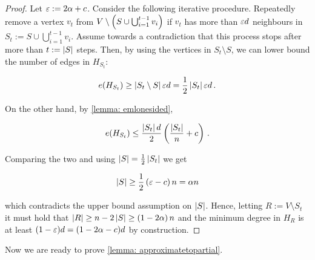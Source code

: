 

\begin{proof}
    Let $\varepsilon:=2\alpha + c$. Consider the following iterative procedure. Repeatedly remove a vertex $v_t$ from $V\setminus \left(S \cup \bigcup_{i=1}^{t-1} v_i\right)$ if $v_t$ has more than $\varepsilon d$ neighbours in $S_t := S \cup \bigcup_{i=1}^{t-1} v_i$. Assume towards a contradiction that this process stops after more than $t:=\left\lvert S\right\rvert$ steps. Then, by using the vertices in $S_t\setminus S$, we can lower bound the number of edges in $H_{S_t}$:

    $$e(H_{S_t})\geq \left\lvert S_t\setminus S\right\rvert \varepsilon d= \frac{1}{2}\left\lvert S_t\right\rvert\varepsilon d\,.$$

    On the other hand, by \cref{lemma: emlonesided},

    $$e(H_{S_t})\leq \frac{\left\lvert S_t\right\rvert d}{2}\left(\frac{\left\lvert S_t\right\rvert}{n} + c\right)\,.$$

    Comparing the two and using $\left\lvert S\right\rvert=\frac{1}{2}\left\lvert S_t\right\rvert$ we get

    $$\left\lvert S\right\rvert\geq\frac{1}{2}\left(\varepsilon-c\right)n=\alpha n$$

    which contradicts the upper bound assumption on $\left\lvert S\right\rvert$. Hence, letting $R:=V\setminus S_t$ it must hold that $\left\lvert R\right\rvert\geq n-2\left\lvert S\right\rvert\geq \left(1-2\alpha\right)n$ and the minimum degree in $H_R$ is at least $(1-\varepsilon)d=(1-2\alpha-c)d$ by construction.
\end{proof}


Now we are ready to prove \cref{lemma: approximatetopartial}.


